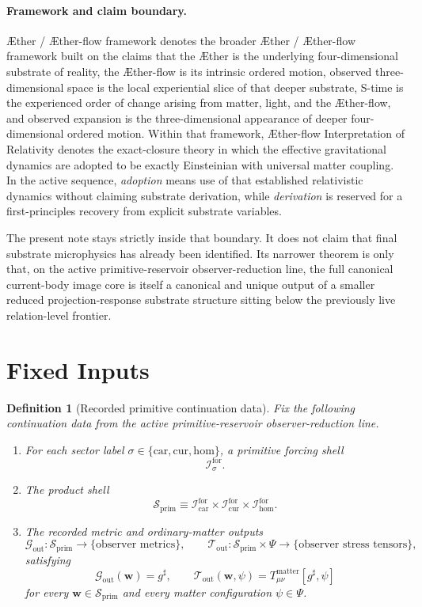 \documentclass[11pt]{article}
\newcommand{\Aether}{\AE{}ther}
\newcommand{\Aflow}{\AE{}ther-flow}
\newcommand{\TheoryName}{\Aflow{} Interpretation of Relativity}
\newcommand{\TheoryProgram}{\Aether{} / \Aflow{} framework}
\newcommand{\CompletedMetric}{g^{\sharp}}
\newcommand{\MatterSpace}{\Psi}
\newcommand{\Car}{\mathrm{car}}
\newcommand{\Cur}{\mathrm{cur}}
\newcommand{\Hom}{\mathrm{hom}}
\newcommand{\ForSpace}[1]{\mathcal I_{#1}^{\mathrm{for}}}
\newcommand{\PrimShell}{\mathcal S_{\mathrm{prim}}}
\newcommand{\MetricOut}{\mathscr G_{\mathrm{out}}}
\newcommand{\MatterOut}{\mathscr T_{\mathrm{out}}}
\newtheorem{definition}{Definition}
\begin{document}
\paragraph{Framework and claim boundary.}
\TheoryProgram{} denotes the broader \Aether{} / \Aflow{} framework built on the claims that the \Aether{} is the underlying four-dimensional substrate of reality, the \Aflow{} is its intrinsic ordered motion, observed three-dimensional space is the local experiential slice of that deeper substrate, S-time is the experienced order of change arising from matter, light, and the \Aflow{}, and observed expansion is the three-dimensional appearance of deeper four-dimensional ordered motion. Within that framework, \TheoryName{} denotes the exact-closure theory in which the effective gravitational dynamics are adopted to be exactly Einsteinian with universal matter coupling. In the active sequence, \emph{adoption} means use of that established relativistic dynamics without claiming substrate derivation, while \emph{derivation} is reserved for a first-principles recovery from explicit substrate variables.

The present note stays strictly inside that boundary. It does not claim that final substrate microphysics has already been identified. Its narrower theorem is only that, on the active primitive-reservoir observer-reduction line, the full canonical current-body image core is itself a canonical and unique output of a smaller reduced projection-response substrate structure sitting below the previously live relation-level frontier.

\section{Fixed Inputs}

\begin{definition}[Recorded primitive continuation data]
\label{def:fixed}
Fix the following continuation data from the active primitive-reservoir observer-reduction line.
\begin{enumerate}
    \item For each sector label \(\sigma\in\{\Car,\Cur,\Hom\}\), a primitive forcing shell
    \[
    \ForSpace{\sigma}.
    \]
    \item The product shell
    \[
    \PrimShell
    \equiv
    \ForSpace{\Car}\times \ForSpace{\Cur}\times \ForSpace{\Hom}.
    \]
    \item The recorded metric and ordinary-matter outputs
    \[
    \MetricOut:\PrimShell\to\{\text{observer metrics}\},
    \qquad
    \MatterOut:\PrimShell\times\MatterSpace\to\{\text{observer stress tensors}\},
    \]
    satisfying
    \begin{equation}
    \MetricOut(\mathbf w)=\CompletedMetric,
    \qquad
    \MatterOut(\mathbf w,\psi)
    =
    T_{\mu\nu}^{\mathrm{matter}}[\CompletedMetric,\psi]
    \label{eq:fixedoutputs}
    \end{equation}
    for every \(\mathbf w\in\PrimShell\) and every matter configuration \(\psi\in\MatterSpace\).
\end{enumerate}
\end{definition}
\end{document}
